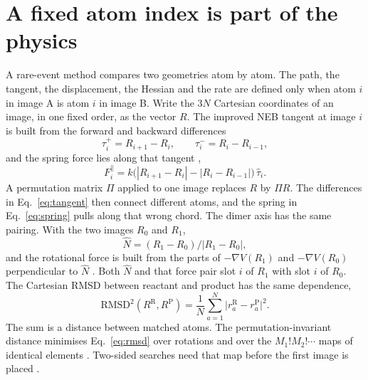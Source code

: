\section{A fixed atom index is part of the physics}\label{sec:identity}
A rare-event method compares two geometries atom by atom.
The path, the tangent, the displacement, the Hessian and the rate are defined only when atom \(i\) in image A is atom \(i\) in image B.
Write the \(3N\) Cartesian coordinates of an image, in one fixed order, as the vector \(R\).
The improved NEB tangent at image \(i\) is built from the forward and backward differences
\begin{equation}
\label{eq:tangent}
\tau_i^{+}=R_{i+1}-R_i,\qquad \tau_i^{-}=R_i-R_{i-1},
\end{equation}
and the spring force lies along that tangent
\cite{jonssonNudgedElasticBand1998,henkelmanImprovedTangentEstimate2000},
\begin{equation}
\label{eq:spring}
F_i^{\parallel}=k\big(|R_{i+1}-R_i|-|R_i-R_{i-1}|\big)\,\hat\tau_i.
\end{equation}
A permutation matrix \(\Pi\) applied to one image replaces \(R\) by \(\Pi R\).
The differences in Eq.~\eqref{eq:tangent} then connect different atoms, and the spring in Eq.~\eqref{eq:spring} pulls along that wrong chord.
The dimer axis has the same pairing.
With the two images \(R_0\) and \(R_1\),
\begin{equation}
\label{eq:dimer}
\hat N=(R_1-R_0)/|R_1-R_0|,
\end{equation}
and the rotational force is built from the parts of \(-\nabla V(R_1)\) and \(-\nabla V(R_0)\) perpendicular to \(\hat N\)
\cite{henkelmanDimerMethodFinding1999}.
Both \(\hat N\) and that force pair slot \(i\) of \(R_1\) with slot \(i\) of \(R_0\).
The Cartesian RMSD between reactant and product has the same dependence,
\begin{equation}
\label{eq:rmsd}
\mathrm{RMSD}^{2}(R^{\mathrm{R}},R^{\mathrm{P}})=\frac{1}{N}\sum_{a=1}^{N}\big|r_a^{\mathrm{R}}-r_a^{\mathrm{P}}\big|^{2}.
\end{equation}
The sum is a distance between matched atoms.
The permutation-invariant distance minimises Eq.~\eqref{eq:rmsd} over rotations and over the \(M_1!M_2!\cdots\) maps of identical elements
\cite{sadeghiMetricsConfigurationSpace2013,deFindingReactionPathways2019,goswamiTwodimensionalRmsdProjections2026,goswamiChemparseplot2026}.
Two-sided searches need that map before the first image is placed
\cite{deFindingReactionPathways2019,goswamiReproducibleOrchestrationBest2026}.
